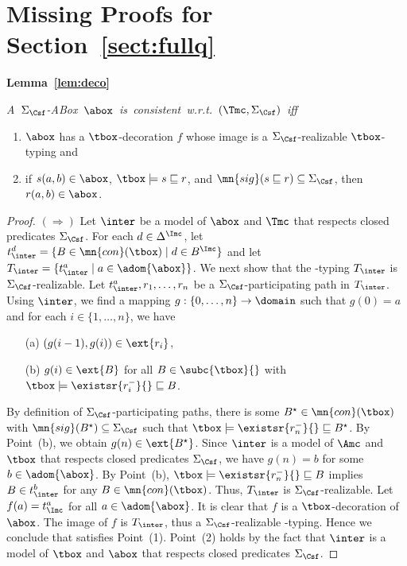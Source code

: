 \documentclass{lmcs}
\theoremstyle{definition}
\begin{document}
\section{Missing Proofs for Section~\ref{sect:fullq}}
{\bf Lemma~\ref{lem:deco}}
{\em
  \mbox{A $\Sigma_{\Csf}$-ABox $\abox$ is consistent w.r.t.~$(\Tmc,\Sigma_{\Csf})$ iff}
  \begin{enumerate}
  \item $\abox$ has a $\tbox$-decoration $f$ whose image is a
    $\Sigma_{\Csf}$-realizable $\tbox$-typing and
  \item if $s(a,b)\in\abox$, $\tbox\models s\sqsubseteq r$, and $\mn{sig}(s\sqsubseteq r)\subseteq\Sigma_{\Csf}$,
     then $r(a,b)\in\abox$.
  \end{enumerate}
}
\begin{proof}
  $(\Rightarrow)$ Let $\inter$ be a model of $\abox$ and $\Tmc$ that
  respects closed predicates $\Sigma_{\Csf}$. For each $d\in \Delta^\Imc$,
  let $t_\inter^d=\{B\in \mn{con}(\tbox)\mid d \in B^\Imc \}$ and let
  $T_\inter=\{t_\inter^a\mid a\in\adom{\abox}\}$. We next show that
  the \Tmc-typing  $T_\inter$   is $\Sigma_{\Csf}$-realizable. Let $t_\inter^a,r_1,\ldots,r_n$ be a
  $\Sigma_{\Csf}$-participating path in $T_\inter$. Using $\inter$, we find a
  mapping $g:\{0,\ldots,n\}\rightarrow\domain$ such that $g(0)=a$ and
  for each $i\in\{1,\ldots,n\}$, we have
  \begin{itemize}
  \item[(a)] $(g(i-1),g(i))\in\ext{r_i}$,
  \item[(b)] $g(i)\in\ext{B}$ for all $B\in\subc{\tbox}{}$ with
    $\tbox\models\existsr{r^-_i}{}\sqsubseteq B$.
  \end{itemize}
  By definition of $\Sigma_{\Csf}$-participating paths, there is some
  $B^\star\in \mn{con}(\tbox)$ with $\mn{sig}(B^\star) \subseteq \Sigma_{\Csf}$
  such that $\tbox\models\existsr{r_n^-}{}\sqsubseteq B^\star$. By
  Point~(b), we obtain $g(n)\in\ext{{B^\star}}$. Since $\inter$ is a model
  of $\Amc$ and $\tbox$ that respects closed predicates $\Sigma_{\Csf}$, we
  have $g(n)=b$ for some $b\in\adom{\abox}$.  By Point~(b),
  $\tbox\models\existsr{r_n^-}{}\sqsubseteq B$ implies $B\in
  t_\inter^b$ for any $B\in\mn{con}(\tbox)$. Thus, $T_\inter$ is
  $\Sigma_{\Csf}$-realizable. Let $f(a)=t^a_\Imc$ for all
  $a\in\adom{\abox}$. It is clear that $f$ is a $\tbox$-decoration of
  $\abox$. The image of $f$ is $T_\inter$, thus a $\Sigma_{\Csf}$-realizable
  \Tmc-typing. Hence we conclude that \Amc satisfies Point~(1). Point~(2) holds by the fact that $\inter$ is a
  model of $\tbox$ and $\abox$ that respects closed predicates
  $\Sigma_{\Csf}$.


\end{proof}
\end{document}
